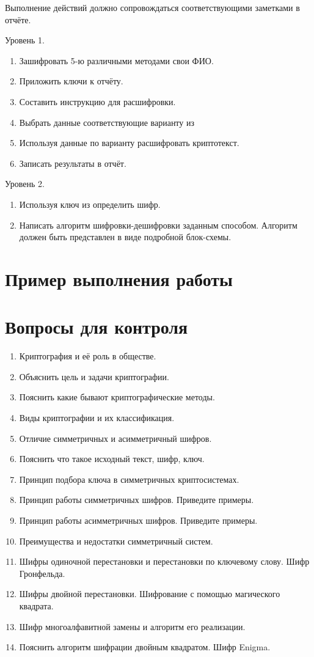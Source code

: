 Выполнение действий должно сопровождаться соответствующими заметками в
отчёте.

\noindent Уровень 1.%
\begin{enumerate}
    \item Зашифровать 5-ю различными методами свои ФИО.
    \item Приложить ключи к отчёту.
    \item Составить инструкцию для расшифровки.
    \item Выбрать данные соответствующие варианту из 
    \item Используя данные по варианту расшифровать криптотекст.
    \item Записать результаты в отчёт.
  \end{enumerate}

\noindent Уровень 2.%

\begin{enumerate}
  \item Используя ключ из  определить шифр.
  \item Написать алгоритм шифровки-дешифровки заданным способом. Алгоритм
      должен быть представлен в виде подробной блок-схемы.
\end{enumerate}
\section{Пример выполнения работы}\label{sect1_c}
%

\section{Вопросы для контроля}\label{sect1_e}
%
\begin{enumerate}
    \item Криптография и её роль в обществе.
    \item Объяснить цель и задачи криптографии.
    \item Пояснить какие бывают криптографические методы.
    \item Виды криптографии и их классификация.
    \item Отличие симметричных и асимметричный шифров.
    \item Пояснить что такое исходный текст, шифр, ключ.
    \item Принцип подбора ключа в симметричных криптосистемах.
    \item Принцип работы симметричных шифров. Приведите примеры.
    \item Принцип работы асимметричных шифров. Приведите примеры.
    \item Преимущества и недостатки симметричный систем.
    \item Шифры одиночной перестановки и перестановки по ключевому слову. Шифр
        Гронфельда.
    \item Шифры двойной перестановки. Шифрование с помощью магического
        квадрата.
    \item Шифр многоалфавитной замены и алгоритм его реализации.
    \item Пояснить алгоритм шифрации двойным квадратом. Шифр Enigma.
\end{enumerate}

